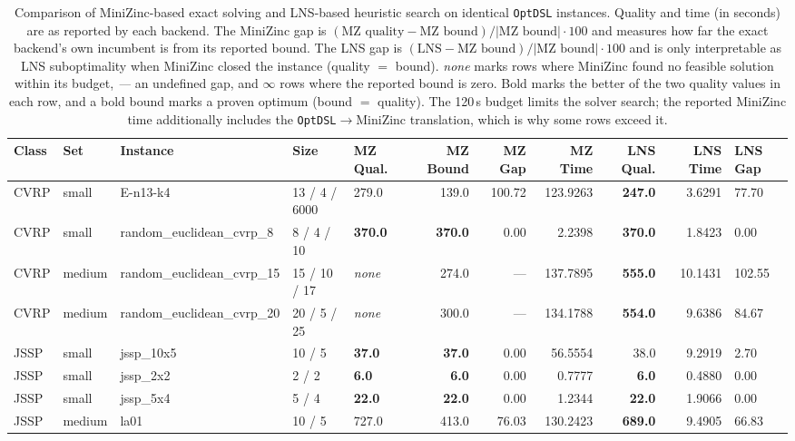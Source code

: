 \documentclass[11pt,a4paper]{article}
\begin{document}
\begin{table}
\centering
\scriptsize
\setlength{\tabcolsep}{4pt}
\caption{Comparison of MiniZinc-based exact solving and LNS-based heuristic
search on identical \texttt{OptDSL} instances. Quality and time (in seconds)
are as reported by each backend. The MiniZinc gap is
$(\text{MZ quality} - \text{MZ bound})/|\text{MZ bound}|\cdot 100$ and
measures how far the exact backend's own incumbent is from its reported
bound. The LNS gap is
$(\text{LNS} - \text{MZ bound})/|\text{MZ bound}|\cdot 100$ and is only
interpretable as LNS suboptimality when MiniZinc closed the instance
(quality $=$ bound).
\textit{none} marks rows where MiniZinc found no feasible solution within its
budget, \textit{---} an undefined gap, and $\infty$ rows where the reported
bound is zero. Bold marks the better of the two quality values in each row,
and a bold bound marks a proven optimum (bound $=$ quality). The 120\,s budget
limits the solver search; the reported MiniZinc time additionally includes the
\texttt{OptDSL}$\to$MiniZinc translation, which is why some rows exceed it.}
\label{tab:study-results}
\begin{tabular}{@{}lllllrrrrrl@{}}
\toprule
Class & Set & Instance & Size & MZ Qual. & MZ Bound & MZ Gap & MZ Time & LNS Qual. & LNS Time & LNS Gap \\
\midrule
CVRP & small & E-n13-k4 & 13 / 4 / 6000 & 279.0 & 139.0 & 100.72 & 123.9263 & \textbf{247.0} & 3.6291 & 77.70 \\
CVRP & small & random\_euclidean\_cvrp\_8 & 8 / 4 / 10 & \textbf{370.0} & \textbf{370.0} & 0.00 & 2.2398 & \textbf{370.0} & 1.8423 & 0.00 \\
CVRP & medium & random\_euclidean\_cvrp\_15 & 15 / 10 / 17 & \textit{none} & 274.0 & --- & 137.7895 & \textbf{555.0} & 10.1431 & 102.55 \\
CVRP & medium & random\_euclidean\_cvrp\_20 & 20 / 5 / 25 & \textit{none} & 300.0 & --- & 134.1788 & \textbf{554.0} & 9.6386 & 84.67 \\
\addlinespace
JSSP & small & jssp\_10x5 & 10 / 5 & \textbf{37.0} & \textbf{37.0} & 0.00 & 56.5554 & 38.0 & 9.2919 & 2.70 \\
JSSP & small & jssp\_2x2 & 2 / 2 & \textbf{6.0} & \textbf{6.0} & 0.00 & 0.7777 & \textbf{6.0} & 0.4880 & 0.00 \\
JSSP & small & jssp\_5x4 & 5 / 4 & \textbf{22.0} & \textbf{22.0} & 0.00 & 1.2344 & \textbf{22.0} & 1.9066 & 0.00 \\
JSSP & medium & la01 & 10 / 5 & 727.0 & 413.0 & 76.03 & 130.2423 & \textbf{689.0} & 9.4905 & 66.83 \\

\end{tabular}
\end{table}
\end{document}
